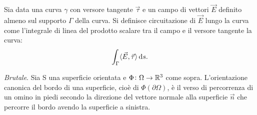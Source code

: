 \begin{definition}
	Sia data una curva $ \gamma $ con versore tangente $ \vec{\tau} $ e un campo di vettori $ \vec{E} $ definito almeno sul supporto $ \Gamma $ della curva. Si definisce circuitazione di $ \vec{E} $ lungo la curva come l'integrale di linea del prodotto scalare tra il campo e il versore tangente la curva: 
	\[
	\int_{\Gamma} \langle {\vec{E}, \vec{\tau}} \rangle \dif{s}.
	\]
\end{definition}

\begin{definition}
	\emph{Brutale}. Sia S una superficie orientata e $ \Phi \colon \Omega \to \mathbb{R}^3 $ come sopra. L'orientazione canonica del bordo di una superficie, cioè di $ \Phi(\partial \Omega) $, è il verso di percorrenza di un omino in piedi secondo la direzione del vettore normale alla superficie $ \vec{n} $ che percorre il bordo avendo la superficie a sinistra.
\end{definition}

